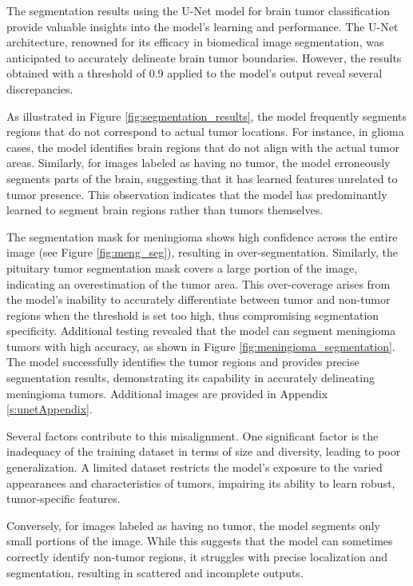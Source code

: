 The segmentation results using the U-Net model for brain tumor classification provide valuable insights into the model's learning and performance. The U-Net architecture, renowned for its efficacy in biomedical image segmentation, was anticipated to accurately delineate brain tumor boundaries. However, the results obtained with a threshold of 0.9 applied to the model's output reveal several discrepancies.

As illustrated in Figure \ref{fig:segmentation_results}, the model frequently segments regions that do not correspond to actual tumor locations. For instance, in glioma cases, the model identifies brain regions that do not align with the actual tumor areas. Similarly, for images labeled as having no tumor, the model erroneously segments parts of the brain, suggesting that it has learned features unrelated to tumor presence. This observation indicates that the model has predominantly learned to segment brain regions rather than tumors themselves.

The segmentation mask for meningioma shows high confidence across the entire image (see Figure \ref{fig:meng_seg}), resulting in over-segmentation. Similarly, the pituitary tumor segmentation mask covers a large portion of the image, indicating an overestimation of the tumor area. This over-coverage arises from the model's inability to accurately differentiate between tumor and non-tumor regions when the threshold is set too high, thus compromising segmentation specificity. Additional testing revealed that the model can segment meningioma tumors with high accuracy, as shown in Figure \ref{fig:meningioma_segmentation}. The model successfully identifies the tumor regions and provides precise segmentation results, demonstrating its capability in accurately delineating meningioma tumors. Additional images are provided in Appendix \ref{s:unetAppendix}.

Several factors contribute to this misalignment. One significant factor is the inadequacy of the training dataset in terms of size and diversity, leading to poor generalization. A limited dataset restricts the model's exposure to the varied appearances and characteristics of tumors, impairing its ability to learn robust, tumor-specific features.

Conversely, for images labeled as having no tumor, the model segments only small portions of the image. While this suggests that the model can sometimes correctly identify non-tumor regions, it struggles with precise localization and segmentation, resulting in scattered and incomplete outputs.

